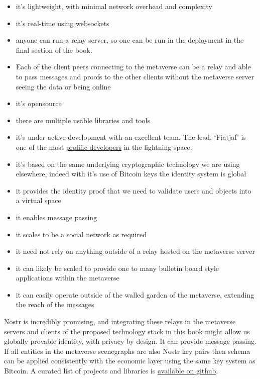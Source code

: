 \begin{itemize}
\item it's lightweight, with minimal network overhead and complexity
\item it's real-time using websockets
\item anyone can run a relay server, so one can be run in the deployment in the final section of the book.
\item Each of the client peers connecting to the metaverse can be a relay and able to pass messages and proofs to the other clients without the metaverse server seeing the data or being online 
\item it's opensource
\item there are multiple usable libraries and tools
\item it's under active development with an excellent team. The lead, `Fiatjaf' is one of the most \href{https://github.com/fiatjaf}{prolific developers} in the lightning space.
\item it's based on the same underlying cryptographic technology we are using elsewhere, indeed with it's use of Bitcoin keys the identity system is global
\item it provides the identity proof that we need to validate users and objects into a virtual space
\item it enables message passing
\item it scales to be a social network as required
\item it need not rely on anything outside of a relay hosted on the metaverse server
\item it can likely be scaled to provide one to many bulletin board style applications within the metaverse
\item it can easily operate outside of the walled garden of the metaverse, extending the reach of the messages
\end{itemize} 
Nostr is incredibly promising, and integrating these relays in the metaverse servers and clients of the proposed technology stack in this book might allow us globally provable identity, with privacy by design. It can provide message passing. If all entities in the metaverse scenegraphs are also Nostr key pairs then schema can be applied consistently with the economic layer using the same key system as Bitcoin. A curated list of projects and libraries is \href{https://github.com/aljazceru/awesome-nostr}{available on github}.

